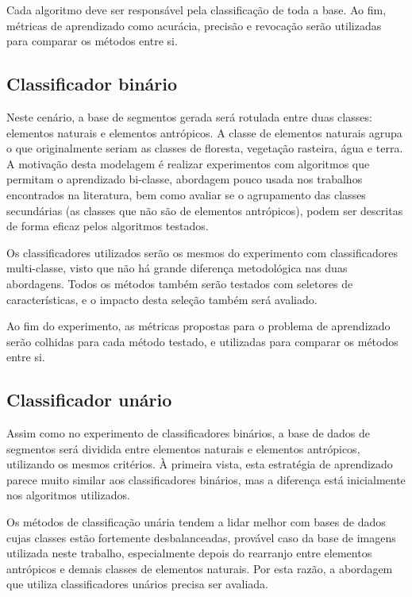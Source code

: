 Cada algoritmo deve ser responsável pela classificação de toda a base. Ao fim, métricas de aprendizado como acurácia, precisão e revocação serão utilizadas para comparar os métodos entre si.

\subsection{Classificador binário}

Neste cenário, a base de segmentos gerada será rotulada entre duas classes: elementos naturais e elementos antrópicos. A classe de elementos naturais agrupa o que originalmente seriam as classes de floresta, vegetação rasteira, água e terra. A motivação desta modelagem é realizar experimentos com algoritmos que permitam o aprendizado bi-classe, abordagem pouco usada nos trabalhos encontrados na literatura, bem como avaliar se o agrupamento das classes secundárias (as classes que não são de elementos antrópicos), podem ser descritas de forma eficaz pelos algoritmos testados.

Os classificadores utilizados serão os mesmos do experimento com classificadores multi-classe, visto que não há grande diferença metodológica nas duas abordagens. Todos os métodos também serão testados com seletores de características, e o impacto desta seleção também será avaliado.

Ao fim do experimento, as métricas propostas para o problema de aprendizado serão colhidas para cada método testado, e utilizadas para comparar os métodos entre si.

\subsection{Classificador unário}

Assim como no experimento de classificadores binários, a base de dados de segmentos será dividida entre elementos naturais e elementos antrópicos, utilizando os mesmos critérios. À primeira vista, esta estratégia de aprendizado parece muito similar aos classificadores binários, mas a diferença está inicialmente nos algoritmos utilizados.

Os métodos de classificação unária tendem a lidar melhor com bases de dados cujas classes estão fortemente desbalanceadas, provável caso da base de imagens utilizada neste trabalho, especialmente depois do rearranjo entre elementos antrópicos e demais classes de elementos naturais. Por esta razão, a abordagem que utiliza classificadores unários precisa ser avaliada.

